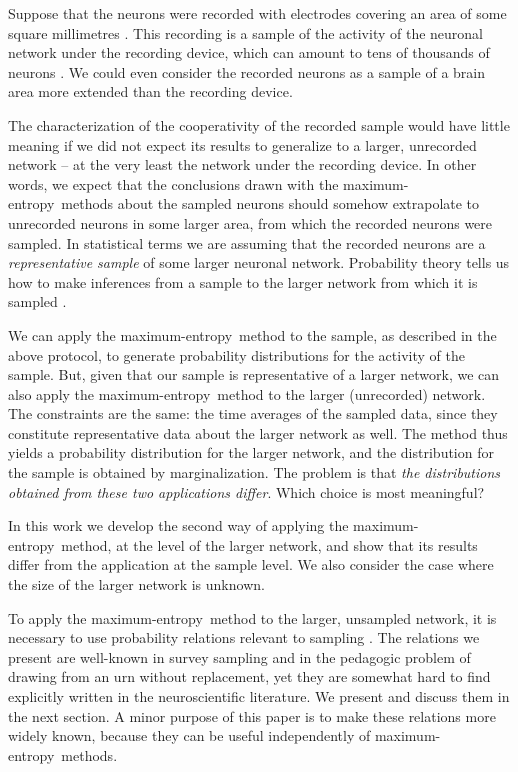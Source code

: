 \documentclass[\ifafour a4paper,12pt,\else a5paper,10pt,\fi%
onecolumn,oneside,article,%
british%
]{memoir}
\theoremstyle{remark}
\theoremstyle{innote}
\let\parentext=\parentexttrack%
\newcommand*{\citep}{\parencites}
\renewcommand*{\|}{\nonscript\,\vert\nonscript\;\mathopen{}}
\newcommand*{\chap}{ch.}%
\newcommand*{\cf}{{cf.}}
\newcommand*{\me}{maximum-entropy}
\begin{document}
Suppose that the neurons were recorded with electrodes covering an area of
some square millimetres \citep[\cf][]{berenyietal2014}. This recording is a
sample of the activity of the neuronal network under the recording
device, which can amount to tens of thousands of neurons
\citep{abeles1991}. We could even consider the recorded neurons as a sample
of a brain area more extended than the recording device.

The characterization of the cooperativity of the recorded sample would have
little meaning if we did not expect its results to generalize to a larger,
unrecorded network -- at the very least the network under the
recording device. In other words, we expect that the conclusions drawn with
the \me\ methods about the sampled neurons should somehow extrapolate to
unrecorded neurons in some larger area, from which the recorded neurons
were sampled. In statistical terms we are assuming that the recorded
neurons are a \emph{representative sample} of some larger neuronal
network. Probability theory tells us how to make inferences from a
sample to the larger network from which it is sampled \parentext{see
  references below}.

We can apply the \me\ method to the sample, as described in the above
protocol, to generate probability distributions for the activity of the
sample. But, given that our sample is representative of a larger
network, we can also apply the \me\ method to the larger (unrecorded)
network. The constraints are the same: the time averages of the sampled
data, since they constitute representative data about the larger network
as well. The method thus yields a probability distribution for the larger
network, and the distribution for the sample is obtained by
marginalization. The problem is that \emph{the distributions obtained from
  these two applications differ}. Which choice is most meaningful?

In this work we develop the second way of applying the \me\ method, at the
level of the larger network, and show that its results differ from the
application at the sample level. We also consider the case where the size
of the larger network is unknown.

To apply the \me\ method to the larger, unsampled network, it is
necessary to use probability relations relevant to sampling
\citep{ghoshetal1997}[parts~I,
VI]{freedmanetal1978_r2007}[\chap~8]{gelmanetal1995_r2014}[\chap~3]{jaynes1994_r2003}.
The relations we present are well-known in survey sampling and in the
pedagogic problem of drawing from an urn without replacement, yet they are
somewhat hard to find explicitly written in the neuroscientific literature.
We present and discuss them in the next section. A minor purpose of this
paper is to make these relations more widely known, because they can be
useful independently of \me\ methods.
\end{document}

